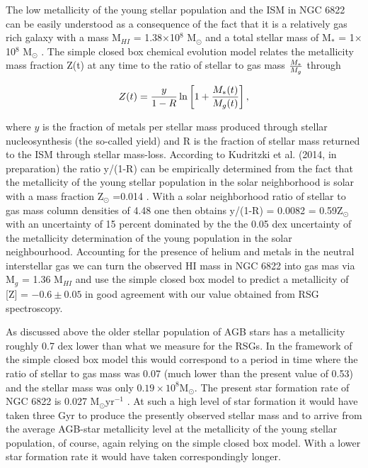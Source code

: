 \documentclass[iop]{emulateapj}
\begin{document}
The low metallicity of the young stellar population and the ISM in NGC 6822 can be easily understood as a consequence of the fact that it is a relatively gas rich galaxy with a mass
M$_{HI}$ = 1.38$\times$10$^{8}$ M$_{\odot}$
\citep{2004AJ....128...16K} and a total stellar mass of
M$_{*}$ = 1$\times$10$^{8}$ M$_{\odot}$
\citep{2014ApJ...789..147W}.
The simple closed box chemical evolution model relates the metallicity mass fraction Z(t) at any time to the ratio of stellar to gas mass $M_{*}\over M_{g}$ through

\begin{equation}\label{closed-box}
Z(t) = {y \over 1-R } \ln \left[ 1 + {M_{*}(t)\over M_{g}(t)}  \right],
\end{equation}

where $y$ is the fraction of metals per stellar mass produced through stellar nucleosynthesis
(the so-called yield) and R is the fraction of stellar mass returned to the ISM through stellar mass-loss.
According to Kudritzki et al. (2014, in preparation) the ratio y/(1-R) can be empirically determined from the fact that the metallicity of the young stellar population in the solar neighborhood is solar with a mass fraction Z$_{\odot}$ =0.014
\citep{2012A&A...539A.143N}.
With a solar neighborhood ratio of stellar to gas mass column densities of 4.48
\citep{2003ApJ...587..278W,2013ApJ...779..115B}
one then obtains y/(1-R) = 0.0082 = 0.59Z$_{\odot}$ with an uncertainty of 15 percent dominated by the the 0.05 dex uncertainty of the metallicity determination of the young population in the solar neighbourhood.
Accounting for the presence of helium and metals in the neutral interstellar gas we can turn the observed HI mass in NGC 6822 into gas mas via M$_{g}$ = 1.36 M$_{HI}$ and use the simple closed box model to predict a metallicity of [Z] = $-0.6\pm0.05$ in good agreement with our value obtained from RSG spectroscopy.

As discussed above the older stellar population of AGB stars has a metallicity roughly 0.7 dex lower than what we measure for the RSGs. In the framework of the simple closed box model this would correspond to a period in time where the ratio of stellar to gas mass was 0.07
(much lower than the present value of 0.53) and the stellar mass was only
$0.19\times10^{8}$M$_{\odot}$.
The present star formation rate of NGC 6822 is 0.027 M$_{\odot}$yr$^{-1}$
\citep{1996A&A...308..723I,2006ApJ...652.1170C,2010A&A...512A..68G}.
At such a high level of star formation it would have taken three Gyr to produce the presently observed stellar mass and to arrive from the average AGB-star metallicity level at the metallicity of the young stellar population, of course, again relying on the simple closed box model.
With a lower star formation rate it would have taken correspondingly longer.
\end{document}
